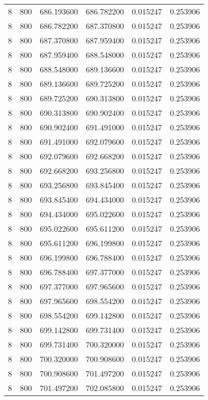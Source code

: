 \begin{longtable}{rrrrrr}
8 & 800 & 686.193600 & 686.782200 & 0.015247 & 0.253906 \\
8 & 800 & 686.782200 & 687.370800 & 0.015247 & 0.253906 \\
8 & 800 & 687.370800 & 687.959400 & 0.015247 & 0.253906 \\
8 & 800 & 687.959400 & 688.548000 & 0.015247 & 0.253906 \\
8 & 800 & 688.548000 & 689.136600 & 0.015247 & 0.253906 \\
8 & 800 & 689.136600 & 689.725200 & 0.015247 & 0.253906 \\
8 & 800 & 689.725200 & 690.313800 & 0.015247 & 0.253906 \\
8 & 800 & 690.313800 & 690.902400 & 0.015247 & 0.253906 \\
8 & 800 & 690.902400 & 691.491000 & 0.015247 & 0.253906 \\
8 & 800 & 691.491000 & 692.079600 & 0.015247 & 0.253906 \\
8 & 800 & 692.079600 & 692.668200 & 0.015247 & 0.253906 \\
8 & 800 & 692.668200 & 693.256800 & 0.015247 & 0.253906 \\
8 & 800 & 693.256800 & 693.845400 & 0.015247 & 0.253906 \\
8 & 800 & 693.845400 & 694.434000 & 0.015247 & 0.253906 \\
8 & 800 & 694.434000 & 695.022600 & 0.015247 & 0.253906 \\
8 & 800 & 695.022600 & 695.611200 & 0.015247 & 0.253906 \\
8 & 800 & 695.611200 & 696.199800 & 0.015247 & 0.253906 \\
8 & 800 & 696.199800 & 696.788400 & 0.015247 & 0.253906 \\
8 & 800 & 696.788400 & 697.377000 & 0.015247 & 0.253906 \\
8 & 800 & 697.377000 & 697.965600 & 0.015247 & 0.253906 \\
8 & 800 & 697.965600 & 698.554200 & 0.015247 & 0.253906 \\
8 & 800 & 698.554200 & 699.142800 & 0.015247 & 0.253906 \\
8 & 800 & 699.142800 & 699.731400 & 0.015247 & 0.253906 \\
8 & 800 & 699.731400 & 700.320000 & 0.015247 & 0.253906 \\
8 & 800 & 700.320000 & 700.908600 & 0.015247 & 0.253906 \\
8 & 800 & 700.908600 & 701.497200 & 0.015247 & 0.253906 \\
8 & 800 & 701.497200 & 702.085800 & 0.015247 & 0.253906 \\

\end{longtable}

